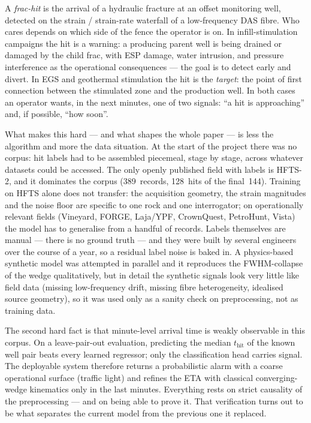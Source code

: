 \documentclass{article}
\begin{document}
A \emph{frac-hit} is the arrival of a hydraulic fracture at an offset
monitoring well, detected on the strain / strain-rate waterfall of a
low-frequency DAS fibre. Who cares depends on which side of the fence
the operator is on. In infill-stimulation campaigns the hit is a
warning: a producing parent well is being drained or damaged by the
child frac, with ESP damage, water intrusion, and pressure interference
as the operational consequences --- the goal is to detect early and
divert. In EGS and geothermal stimulation the hit is the \emph{target}:
the point of first connection between the stimulated zone and the
production well. In both cases an operator wants, in the next minutes,
one of two signals: ``a hit is approaching'' and, if possible, ``how
soon''.

What makes this hard --- and what shapes the whole paper --- is less
the algorithm and more the data situation. At the start of the project
there was no corpus: hit labels had to be assembled piecemeal, stage by
stage, across whatever datasets could be accessed. The only openly
published field with labels is HFTS-2, and it dominates the corpus
(389~records, 128~hits of the final~144). Training on HFTS alone does
not transfer: the acquisition geometry, the strain magnitudes and the
noise floor are specific to one rock and one interrogator; on
operationally relevant fields (Vineyard, FORGE, Laja/YPF, CrownQuest,
PetroHunt, Vista) the model has to generalise from a handful of
records. Labels themselves are manual --- there is no ground truth ---
and they were built by several engineers over the course of a year, so
a residual label noise is baked in. A physics-based synthetic model was
attempted in parallel and it reproduces the FWHM-collapse of the wedge
qualitatively, but in detail the synthetic signals look very little
like field data (missing low-frequency drift, missing fibre
heterogeneity, idealised source geometry), so it was used only as a
sanity check on preprocessing, not as training data.

The second hard fact is that minute-level arrival time is weakly
observable in this corpus. On a leave-pair-out evaluation, predicting
the median $t_\text{hit}$ of the known well pair beats every learned
regressor; only the classification head carries signal. The deployable
system therefore returns a probabilistic alarm with a coarse
operational surface (traffic light) and refines the ETA with classical
converging-wedge kinematics only in the last minutes. Everything rests
on strict causality of the preprocessing --- and on being able to prove
it. That verification turns out to be what separates the current model
from the previous one it replaced.
\end{document}
